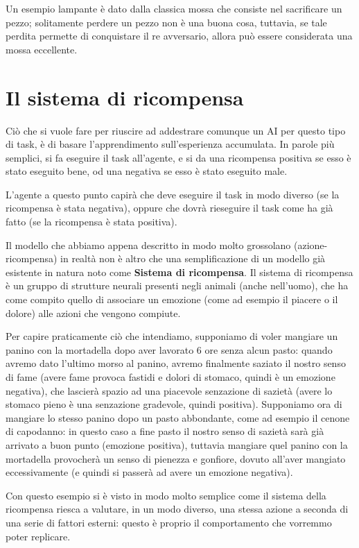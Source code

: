 \documentclass[a4paper,11pt,twoside]{report} %
\begin{document}
Un esempio lampante è dato dalla classica mossa che consiste nel sacrificare un pezzo; solitamente perdere un pezzo non è una buona cosa, tuttavia, se tale perdita permette di conquistare il re avversario, allora può essere considerata una mossa eccellente.

\section{Il sistema di ricompensa}

Ciò che si vuole fare per riuscire ad addestrare comunque un AI per questo tipo di task, è di basare l'apprendimento sull'esperienza accumulata. In parole più semplici, si fa eseguire il task all'agente, e si da una ricompensa positiva se esso è stato eseguito bene, od una negativa se esso è stato eseguito male.

L'agente a questo punto capirà che deve eseguire il task in modo diverso (se la ricompensa è stata negativa), oppure che dovrà rieseguire il task come ha già fatto (se la ricompensa è stata positiva).

Il modello che abbiamo appena descritto in modo molto grossolano (azione-ricompensa) in realtà non è altro che una semplificazione di un modello già esistente in natura noto come \textbf{Sistema di ricompensa}. Il sistema di ricompensa è un gruppo di strutture neurali presenti negli animali (anche nell'uomo), che ha come compito quello di associare un emozione (come ad esempio il piacere o il dolore) alle azioni che vengono compiute. 

Per capire praticamente ciò che intendiamo, supponiamo di voler mangiare un panino con la mortadella dopo aver lavorato 6 ore senza alcun pasto: quando avremo dato l'ultimo morso al panino, avremo finalmente saziato il nostro senso di fame (avere fame provoca fastidi e dolori di stomaco, quindi è un emozione negativa), che lascierà spazio ad una piacevole senzazione di sazietà (avere lo stomaco pieno è una senzazione gradevole, quindi positiva). Supponiamo ora di mangiare lo stesso panino dopo un pasto abbondante, come ad esempio il cenone di capodanno: in questo caso a fine pasto il nostro senso di sazietà sarà già arrivato a buon punto (emozione positiva), tuttavia mangiare quel panino con la mortadella  provocherà un senso di pienezza e gonfiore, dovuto all'aver mangiato eccessivamente (e quindi si passerà ad avere un emozione negativa). 

Con questo esempio si è visto in modo molto semplice come il sistema della ricompensa riesca a valutare, in un modo diverso, una stessa azione a seconda di una serie di fattori esterni: questo è proprio il comportamento che vorremmo poter replicare.
\end{document}
